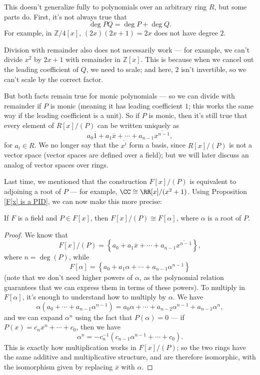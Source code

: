 \begin{note}
    This doesn't generalize fully to polynomials over an arbitrary ring $R$, but some parts do. First, it's not always true that \[\deg PQ = \deg P + \deg Q.\] For example, in $\mathbb{Z}/4[x]$, $(2x)(2x + 1) = 2x$ does not have degree $2$.
    
    Division with remainder also does not necessarily work --- for example, we can't divide $x^2$ by $2x + 1$ with remainder in $\mathbb{Z}[x]$. This is because when we cancel out the leading coefficient of $Q$, we need to scale; and here, $2$ isn't invertible, so we can't scale by the correct factor.

    But both facts remain true for monic polynomials --- so we can divide with remainder if $P$ is monic (meaning it has leading coefficient $1$; this works the same way if the leading coefficient is a unit). So if $P$ is monic, then it's still true that every element of $R[x]/(P)$ can be written uniquely as \[a_0\overline{1} + a_1\overline{x} + \cdots + a_{n - 1}\overline{x^{n - 1}},\] for $a_i \in R$. We no longer say that the $\overline{x^i}$ form a basis, since $R[x]/(P)$ is not a vector space (vector spaces are defined over a field); but we will later discuss an analog of vector spaces over rings.
\end{note}

Last time, we mentioned that the construction $F[x]/(P)$ is equivalent to adjoining a root of $P$ --- for example, $\CC \cong \RR[x]/(x^2 + 1)$. Using Proposition \ref{F[x] is a PID}, we can now make this more precise: 

\begin{proposition}
If $F$ is a field and $P \in F[x]$, then $F[x]/(P) \cong F[\alpha]$, where $\alpha$ is a root of $P$. 
\end{proposition}

\begin{proof}
We know that \[F[x]/(P) = \left\{a_0 + a_1\overline{x} + \cdots + a_{n - 1}\overline{x^{n - 1}}\right\},\] where $n = \deg(P)$, while \[F[\alpha] = \left\{a_0 + a_1\alpha + \cdots + a_{n - 1}\alpha^{n - 1}\right\}\] (note that we don't need higher powers of $\alpha$, as the polynomial relation guarantees that we can express them in terms of these powers). To multiply in $F[\alpha]$, it's enough to understand how to multiply by $\alpha$. We have \[\alpha(a_0 + \cdots + a_{n - 1}\alpha^{n - 1}) = a_0\alpha + \cdots + a_{n - 2}\alpha^{n - 1} + a_{n - 1}\alpha^n,\] and we can expand $\alpha^n$ using the fact that $P(\alpha) = 0$ --- if $P(x) = c_nx^n + \cdots + c_0$, then we have \[\alpha^n = -c_n^{-1}(c_{n - 1}\alpha^{n - 1} + \cdots + c_0).\] This is exactly how multiplication works in $F[x]/(P)$; so the two rings have the same additive and multiplicative structure, and are therefore isomorphic, with the isomorphism given by replacing $\overline{x}$ with $\alpha$. 
\end{proof}


